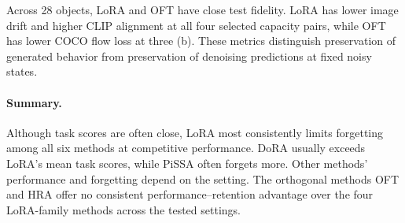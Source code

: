 Across 28 objects, LoRA and OFT have close test fidelity. LoRA has lower image drift and higher CLIP alignment at all four selected capacity pairs, while OFT has lower COCO flow loss at three (b). These metrics distinguish preservation of generated behavior from preservation of denoising predictions at fixed noisy states.

\paragraph{Summary.}
Although task scores are often close, LoRA most consistently limits forgetting among all six methods at competitive performance. DoRA usually exceeds LoRA's mean task scores, while PiSSA often forgets more. Other methods' performance and forgetting depend on the setting. The orthogonal methods OFT and HRA offer no consistent performance--retention advantage over the four LoRA-family methods across the tested settings.

